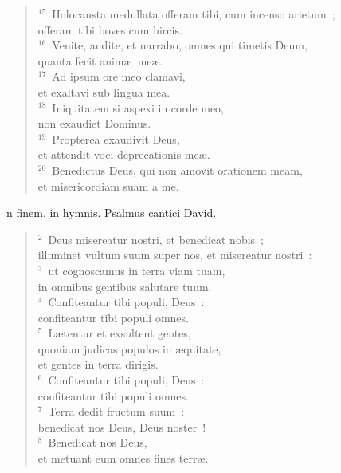 \begin{flushleft}
\begin{verse}
${}^{15}$~Holocausta medullata offeram tibi, cum incenso arietum~;\\ offeram tibi boves cum hircis.\\
${}^{16}$~Venite, audite, et narrabo, omnes qui timetis Deum,\\ quanta fecit anim\ae\ me\ae .\\
${}^{17}$~Ad ipsum ore meo clamavi,\\ et exaltavi sub lingua mea.\\
${}^{18}$~Iniquitatem si aspexi in corde meo,\\ non exaudiet Dominus.\\
${}^{19}$~Propterea exaudivit Deus,\\ et attendit voci deprecationis me\ae .\\
${}^{20}$~Benedictus Deus, qui non amovit orationem meam,\\ et misericordiam suam a me.\end{verse}\end{flushleft}



\bchapter
{}n finem, in hymnis. Psalmus cantici David.
\begin{flushleft}\begin{verse}\vspace{6pt}${}^{2}$~Deus misereatur nostri, et benedicat nobis~;\\ illuminet vultum suum super nos, et misereatur nostri~:\\
${}^{3}$~ut cognoscamus in terra viam tuam,\\ in omnibus gentibus salutare tuum.\\
${}^{4}$~Confiteantur tibi populi, Deus~:\\ confiteantur tibi populi omnes.\\
${}^{5}$~L\ae tentur et exsultent gentes,\\ quoniam judicas populos in \ae quitate,\\ et gentes in terra dirigis.\\
${}^{6}$~Confiteantur tibi populi, Deus~:\\ confiteantur tibi populi omnes.\\
${}^{7}$~Terra dedit fructum suum~:\\ benedicat nos Deus, Deus noster~!\\
${}^{8}$~Benedicat nos Deus,\\ et metuant eum omnes fines terr\ae .\end{verse}\end{flushleft}



